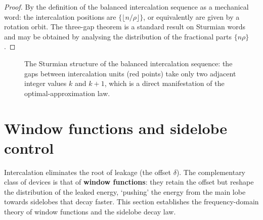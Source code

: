 \begin{proof}
By the definition of the balanced intercalation sequence as a mechanical word: the intercalation positions are $\{\lfloor n/\rho\rfloor\}$, or equivalently are given by a rotation orbit. The three-gap theorem is a standard result on Sturmian words and may be obtained by analysing the distribution of the fractional parts $\{n\rho\}$.
\end{proof}

\begin{figure}[htbp]
\centering
{}
\caption{The Sturmian structure of the balanced intercalation sequence: the gaps between intercalation units (red points) take only two adjacent integer values $k$ and $k+1$, which is a direct manifestation of the optimal-approximation law.}
\label{fig:sturmian_intercalation}
\end{figure}

\section{Window functions and sidelobe control}\label{sec:window_functions}

Intercalation eliminates the root of leakage (the offset $\delta$). The complementary class of devices is that of \textbf{window functions}: they retain the offset but reshape the distribution of the leaked energy, `pushing' the energy from the main lobe towards sidelobes that decay faster. This section establishes the frequency-domain theory of window functions and the sidelobe decay law.

